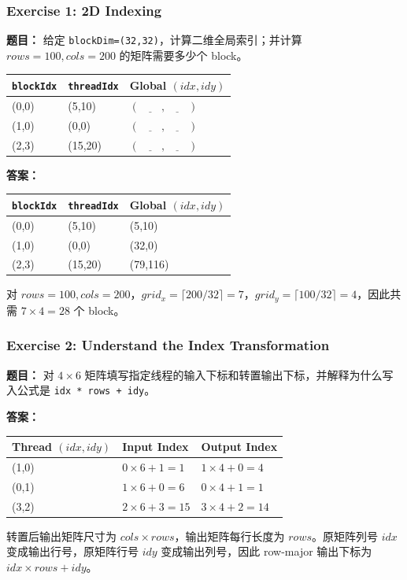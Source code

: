 \documentclass[10pt,a4paper]{article}
\begin{document}
\subsubsection{Exercise 1: 2D Indexing}
\noindent\textbf{题目：} 给定 \texttt{blockDim=(32,32)}，计算二维全局索引；并计算 $rows=100, cols=200$ 的矩阵需要多少个 block。
\begin{center}
\small
\begin{tabular}{lll}
\toprule
\texttt{blockIdx} & \texttt{threadIdx} & Global $(idx,idy)$ \\
\midrule
(0,0) & (5,10) & $(\underline{\hspace{2em}},\underline{\hspace{2em}})$ \\
(1,0) & (0,0) & $(\underline{\hspace{2em}},\underline{\hspace{2em}})$ \\
(2,3) & (15,20) & $(\underline{\hspace{2em}},\underline{\hspace{2em}})$ \\
\bottomrule
\end{tabular}
\end{center}
\noindent\textbf{答案：}
\begin{center}
\small
\begin{tabular}{lll}
\toprule
\texttt{blockIdx} & \texttt{threadIdx} & Global $(idx,idy)$ \\
\midrule
(0,0) & (5,10) & (5,10) \\
(1,0) & (0,0) & (32,0) \\
(2,3) & (15,20) & (79,116) \\
\bottomrule
\end{tabular}
\end{center}
对 $rows=100,cols=200$，$grid_x=\lceil200/32\rceil=7$，$grid_y=\lceil100/32\rceil=4$，因此共需 $7\times4=28$ 个 block。

\subsubsection{Exercise 2: Understand the Index Transformation}
\noindent\textbf{题目：} 对 $4\times6$ 矩阵填写指定线程的输入下标和转置输出下标，并解释为什么写入公式是 \texttt{idx * rows + idy}。

\noindent\textbf{答案：}
\begin{center}
\small
\begin{tabular}{lll}
\toprule
Thread $(idx,idy)$ & Input Index & Output Index \\
\midrule
(1,0) & $0\times6+1=1$ & $1\times4+0=4$ \\
(0,1) & $1\times6+0=6$ & $0\times4+1=1$ \\
(3,2) & $2\times6+3=15$ & $3\times4+2=14$ \\
\bottomrule
\end{tabular}
\end{center}
转置后输出矩阵尺寸为 $cols\times rows$，输出矩阵每行长度为 $rows$。原矩阵列号 $idx$ 变成输出行号，原矩阵行号 $idy$ 变成输出列号，因此 row-major 输出下标为 $idx\times rows+idy$。
\end{document}
